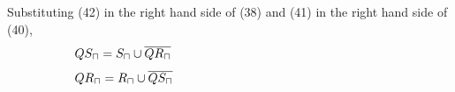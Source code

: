 \documentclass[10pt,journal]{IEEEtran}
\begin{document}
Substituting (42) in the right hand side of (38) and  (41) in the right hand side of (40),  
\begin{equation}
 \begin{minipage}{250pt}
\begin{flushleft} $\displaystyle QS_{\sqcap} = S_{\sqcap}  \cup  \overline{QR_{\sqcap}}$  \end{flushleft}
 \end{minipage}
 \end{equation}
\begin{equation}
 \begin{minipage}{250pt}
\begin{flushleft} $\displaystyle QR_{\sqcap} = R_{\sqcap}  \cup  \overline{QS_{\sqcap}}$  \end{flushleft}
 \end{minipage}
 \end{equation}
\end{document}
